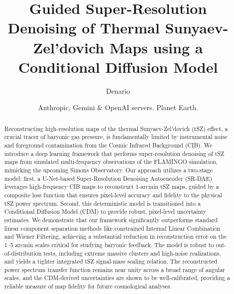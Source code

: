 \documentclass[]{article}
\begin{document}
\title{Guided Super-Resolution Denoising of Thermal Sunyaev-Zel'dovich Maps using a Conditional Diffusion Model}

\author{Denario}
\date{Anthropic, Gemini \& OpenAI servers. Planet Earth.}

\maketitle
\begin{abstract}
Reconstructing high-resolution maps of the thermal Sunyaev-Zel'dovich (tSZ) effect, a crucial tracer of baryonic gas pressure, is fundamentally limited by instrumental noise and foreground contamination from the Cosmic Infrared Background (CIB). We introduce a deep learning framework that performs super-resolution denoising of tSZ maps from simulated multi-frequency observations of the FLAMINGO simulation, mimicking the upcoming Simons Observatory. Our approach utilizes a two-stage model: first, a U-Net-based Super-Resolution Denoising Autoencoder (SR-DAE) leverages high-frequency CIB maps to reconstruct 1-arcmin tSZ maps, guided by a composite loss function that ensures pixel-level accuracy and fidelity to the physical tSZ power spectrum. Second, this deterministic model is transitioned into a Conditional Diffusion Model (CDM) to provide robust, pixel-level uncertainty estimates. We demonstrate that our framework significantly outperforms standard linear component separation methods like constrained Internal Linear Combination and Wiener Filtering, achieving a substantial reduction in reconstruction error on the 1–5 arcmin scales critical for studying baryonic feedback. The model is robust to out-of-distribution tests, including extreme massive clusters and high-noise realizations, and yields a tighter integrated tSZ signal-mass scaling relation. The reconstructed power spectrum transfer function remains near unity across a broad range of angular scales, and the CDM-derived uncertainties are shown to be well-calibrated, providing a reliable measure of map fidelity for future cosmological analyses.
\end{abstract}
\end{document}
